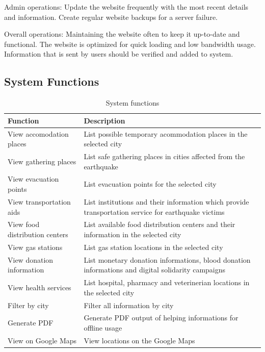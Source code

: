 \documentclass[12pt]{report}
\begin{document}
Admin operations: Update the website frequently with the most recent details and information. Create regular
website backups for a server failure.

Overall operations: Maintaining the website often to keep it up-to-date and functional. The website
is optimized for quick loading and low bandwidth usage. Information that is sent by users should
be verified and added to system.


\subsection{System Functions}
\renewcommand{\arraystretch}{2}
\begin{table}[H]
    
    \begin{tabular}{|l|p{10cm}|}
        \hline
    \textbf{Function}              & \textbf{Description} \\ \hline
    View accomodation places       & List possible temporary acommodation places in the selected city \\ \hline
    View gathering places          & List safe gathering places in cities affected from the earthquake \\ \hline
    View evacuation points         & List evacuation points for the selected city \\ \hline
    View transportation aids       & List institutions and their information which provide transportation service for earthquake victims \\ \hline
    View food distribution centers & List available food distribution centers and their information in the selected city \\ \hline
    View gas stations              & List gas station locations in the selected city \\ \hline
    View donation information      & List monetary donation informations, blood donation informations and digital solidarity campaigns \\ \hline
    View health services           & List hospital, pharmacy and veterinerian locations in the selected city \\ \hline
    Filter by city                 & Filter all information by city \\ \hline
    Generate PDF                   & Generate PDF output of helping informations for offline usage \\ \hline
    View on Google Maps            & View locations on the Google Maps \\ \hline
    \end{tabular}
    \caption{System functions}
\end{table}
\end{document}
